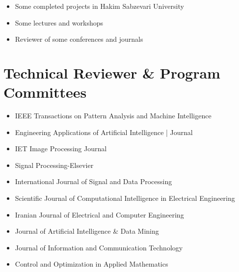 \documentclass[10pt,a4paper]{moderncv}
\begin{document}
\begin{itemize}
\item Some completed projects in Hakim Sabzevari University
\item Some lectures and workshops%
\item Reviewer of some conferences and journals
\end{itemize}


\section{Technical Reviewer \& Program Committees}

\begin{itemize}
\item IEEE Transactions on Pattern Analysis and Machine Intelligence
\item Engineering Applications of Artificial Intelligence | Journal
\item IET Image Processing Journal
\item Signal Processing-Elsevier
\item International Journal of Signal and Data Processing
\item Scientific Journal of Computational Intelligence in Electrical Engineering
\item Iranian Journal of Electrical and Computer Engineering
\item Journal of Artificial Intelligence \& Data Mining
\item Journal of Information and Communication Technology 
\item Control and Optimization in Applied Mathematics


\end{itemize}
\end{document}
